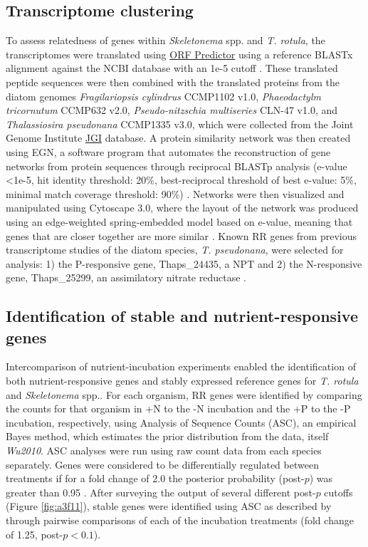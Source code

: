 \subsection{Transcriptome clustering}
To assess relatedness of genes within \textit{Skeletonema} spp. and \textit{T. rotula}, the transcriptomes were translated using \href{http://proteomics.ysu.edu/tools/OrfPredictor.html}{ORF Predictor} using a reference BLASTx alignment against the NCBI database with an 1e-5 cutoff \citep{Min2005}. These translated peptide sequences were then combined with the translated proteins from the diatom genomes \textit{Fragilariopsis cylindrus} CCMP1102 v1.0, \textit{Phaeodactylm tricornutum} CCMP632 v2.0, \textit{Pseudo-nitzschia multiseries} CLN-47 v1.0, and \textit{Thalassiosira pseudonana} CCMP1335 v3.0, which were collected from the Joint Genome Institute \href{http://genome.jgi-psf.org}{JGI} database. A protein similarity network was then created using EGN, a software program that automates the reconstruction of gene networks from protein sequences through reciprocal BLASTp analysis (e-value <1e-5, hit identity threshold: 20\%, best-reciprocal threshold of best e-value: 5\%, minimal match coverage threshold: 90\%) \citep{Halary2013, Halary2010}. Networks were then visualized and manipulated using Cytoscape 3.0, where the layout of the network was produced using an edge-weighted spring-embedded model based on e-value, meaning that genes that are closer together are more similar \citep{Smoot2011, Saito2012}. Known RR genes from previous transcriptome studies of the diatom species, \textit{T. pseudonana}, were selected for analysis: 1) the P-responsive gene, Thaps\_24435, a NPT \citep{Dyhrman2012} and 2) the N-responsive gene, Thaps\_25299, an assimilatory nitrate reductase \citep{Bender2014}. 
\subsection{Identification of stable and nutrient-responsive genes}
Intercomparison of nutrient-incubation experiments enabled the identification of both nutrient-responsive genes and stably expressed reference genes for \textit{T. rotula} and \textit{Skeletonema} spp.. For each organism, RR genes were identified by comparing the counts for that organism in +N to the -N incubation and the +P to the -P incubation, respectively, using Analysis of Sequence Counts (ASC), an empirical Bayes method, which estimates the prior distribution from the data, itself \textit{Wu2010}. ASC analyses were run using raw count data from each species separately. Genes were considered to be differentially regulated between treatments if for a fold change of 2.0 the posterior probability (post-$p$) was greater than 0.95 \citep{Dyhrman2012}. After surveying the output of several different post-$p$ cutoffs (Figure \ref{fig:a3f11}), stable genes were identified using ASC as described by \citet{Alexander2012} through pairwise comparisons of each of the incubation treatments (fold change of 1.25, post-$p < 0.1$). 

